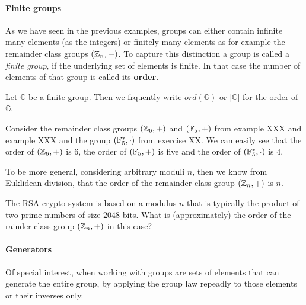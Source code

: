 \paragraph{Finite groups} As we have seen in the previous examples, groups can either contain infinite many elements (as the integers) or finitely many elements as for example the remainder class groups $(\mathbb{Z}_n,+)$. To capture this distinction a group is called a \textit{finite group}, if the underlying set of elements is finite. In that case the number of elements of that group is called its \textbf{order}.
\begin{notation}
Let $\mathbb{G}$ be a finite group. Then we frquently write $ord(\mathbb{G})$ or  $|\mathbb{G}|$ for the order of $\mathbb{G}$.
\end{notation}
\begin{example}
Consider the remainder class groups $(\mathbb{Z}_6,+)$ and $(\mathbb{F}_5,+)$ from example XXX and example XXX and the group $(\mathbb{F}_5^*,\cdot)$ from exercise XX. We can easily see that the order of $(\mathbb{Z}_6,+)$ is $6$, the order of $(\mathbb{F}_5,+)$ is five and the order of $(\mathbb{F}_5^*,\cdot)$ is $4$.

To be more general, considering arbitrary moduli $n$, then we know from Euklidean division, that the order of the remainder class group $(\mathbb{Z}_n,+)$ is $n$. 
\end{example}
\begin{exercise}The RSA crypto system is based on a modulus $n$ that is typically the product of two prime numbers of size $2048$-bits. What is (approximately) the order of the rainder class group $(\mathbb{Z}_n,+)$ in this case? 
\end{exercise}
\paragraph{Generators} Of special interest, when working with groups are sets of elements that can generate the entire group, by applying the group law repeadly to those elements or their inverses only. 

